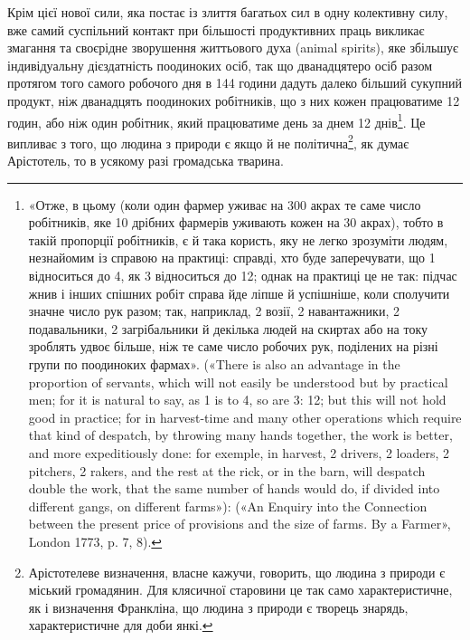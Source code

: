 Крім цієї нової сили, яка постає із злиття багатьох сил в одну
колективну силу, вже самий суспільний контакт при більшості
продуктивних праць викликає змагання та своєрідне зворушення
життьового духа (animal spirits), яке збільшує індивідуальну
дієздатність поодиноких осіб, так що дванадцятеро осіб
разом протягом того самого робочого дня в 144 години дадуть
далеко більший сукупний продукт, ніж дванадцять поодиноких
робітників, що з них кожен працюватиме 12 годин, або ніж один
робітник, який працюватиме день за днем 12 днів\footnote{
«Отже, в цьому (коли один фармер уживає на 300 акрах те саме
число робітників, яке 10 дрібних фармерів уживають кожен на 30 акрах),
тобто в такій пропорції робітників, є й така користь, яку не легко зрозуміти
людям, незнайомим із справою на практиці: справді, хто буде
заперечувати, що 1 відноситься до 4, як 3 відноситься до 12; однак на
практиці це не так: підчас жнив і інших спішних робіт справа йде ліпше
й успішніше, коли сполучити значне число рук разом; так, наприклад,
2 возії, 2 навантажники, 2 подавальники, 2 загрібальники й декілька
людей на скиртах або на току зроблять удвоє більше, ніж те саме число
робочих рук, поділених на різні групи по поодиноких фармах». («There
is also an advantage in the proportion of servants, which will not easily be
understood but by practical men; for it is natural to say, as 1 is to 4, so
are 3: 12; but this will not hold good in practice; for in harvest-time
and many other operations which require that kind of despatch, by throwing
many hands together, the work is better, and more expeditiously done:
for exemple, in harvest, 2 drivers, 2 loaders, 2 pitchers, 2 rakers, and the
rest at the rick, or in the barn, will despatch double the work, that the same
number of hands would do, if divided into different gangs, on different
farms»): («An Enquiry into the Connection between the present price of
provisions and the size of farms. By a Farmer», London 1773, p. 7, 8).
}. Це випливає
з того, що людина з природи є якщо й не політична\footnote{
Арістотелеве визначення, власне кажучи, говорить, що людина з природи є міський громадянин.
Для клясичної старовини це так само
характеристичне, як і визначення Франкліна, що людина з природи є
творець знарядь, характеристичне для доби янкі.
}, як думає
Арістотель, то в усякому разі громадська тварина.

